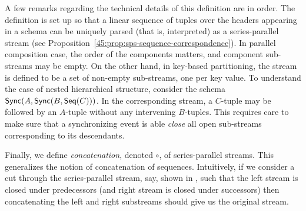 A few remarks regarding the technical details of this definition are in order.
The definition is set up so that a linear sequence of tuples over the headers
appearing in a schema can be uniquely parsed (that is, interpreted) as a series-parallel
stream (see Proposition~\ref{45:prop:sps-sequence-correspondence}). In parallel composition case, the order of the components matters, and component sub-streams may be empty. On the other hand, in key-based
partitioning, the stream is defined to be a set of non-empty sub-streams, one per key value.
To understand the case of nested hierarchical structure, consider the schema
$\mathsf{Sync}({A}, \mathsf{Sync}({B}, \mathsf{Seq}({C})))$. In the corresponding stream,
a $C$-tuple may be followed by an $A$-tuple without any intervening $B$-tuples.
This requires care to make sure that a synchronizing event is able {\em close}
all open sub-streams corresponding to its descendants.

Finally, we define {\em concatenation}, denoted $\circ$, of series-parallel streams.
This generalizes the notion of concatenation of sequences.
Intuitively, if we consider a cut through the series-parallel stream, say, shown in , such that the left stream is closed under predecessors (and right stream
is closed under successors) then concatenating the left and right substreams should give us the
original stream.

